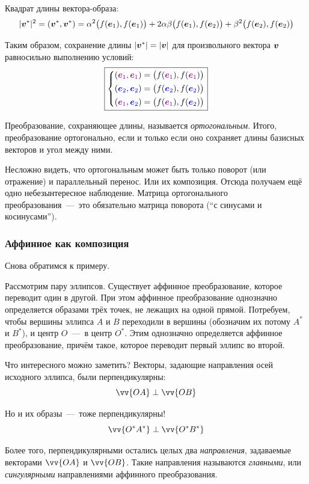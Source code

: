 \documentclass[a4paper,12pt]{article}
\begin{document}
  Квадрат длины вектора-образа:
  \[
    |\boldsymbol v^*|^2 = (\boldsymbol v^*, \boldsymbol v^*) = \alpha^2 \bigl(f(\boldsymbol e_1), f(\boldsymbol e_1)\bigr) + 2 \alpha \beta \bigl(f(\boldsymbol e_1), f(\boldsymbol e_2)\bigr) + \beta^2 \bigl(f(\boldsymbol e_2), f(\boldsymbol e_2)\bigr)
  \]
  
  Таким образом, сохранение длины $|\bds v^*| \hm= |\bds v|$ для произвольного вектора $\boldsymbol v$ равносильно выполнению условий:
  \[
    \boxed{
      \left\{
        \begin{aligned}
          &(\textcolor{my-red}{\bds e_1}, \textcolor{my-red}{\bds e_1}) = \bigl(f(\textcolor{my-red}{\bds e_1}), f(\textcolor{my-red}{\bds e_1})\bigr)\\
          &(\textcolor{my-blue}{\bds e_2}, \textcolor{my-blue}{\bds e_2}) = \bigl(f(\textcolor{my-blue}{\bds e_2}), f(\textcolor{my-blue}{\bds e_2})\bigr)\\
          &(\textcolor{my-red}{\bds e_1}, \textcolor{my-blue}{\bds e_2}) = \bigl(f(\textcolor{my-red}{\bds e_1}), f(\textcolor{my-blue}{\bds e_2})\bigr)
        \end{aligned}
      \right.
    }
  \]
  
  Преобразование, сохраняющее длины, называется \emph{ортогональным}.
  Итого, преобразование ортогонально, если и только если оно сохраняет длины базисных векторов и угол между ними.
  
  Несложно видеть, что ортогональным может быть только поворот (или отражение) и параллельный перенос.
  Или их композиция.
  Отсюда получаем ещё одно небезынтересное наблюдение.
  Матрица ортогонального преобразования~---~это обязательно матрица поворота (``с синусами и косинусами'').
  
  
  \subsubsection{Аффинное как композиция}
  
  Снова обратимся к примеру.
  
  \begin{example}
    Рассмотрим пару эллипсов.
    Существует аффинное преобразование, которое переводит один в другой.
    При этом аффинное преобразование однозначно определяется образами трёх точек, не лежащих на одной прямой.
    Потребуем, чтобы вершины эллипса $A$ и $B$ переходили в вершины (обозначим их потому $A^*$ и $B^*$), и центр $O$~---~в центр $O^*$.
    Этим однозначно определяется аффинное преобразование, причём такое, которое переводит первый эллипс во второй.
    
    Что интересного можно заметить?
    Векторы, задающие направления осей исходного эллипса, были перпендикулярны:
    \[
      \vv{OA} \perp \vv{OB}
    \]
    
    Но и их образы~---~тоже перпендикулярны!
    \[
      \vv{O^*A^*} \perp \vv{O^*B^*}
    \]
    
    Более того, перпендикулярными остались целых два \emph{направления}, задаваемые векторами $\vv{OA}$ и $\vv{OB}$.
    Такие направления называются \emph{главными}, или \emph{сингулярными} направлениями аффинного преобразования.
  \end{example}
  
\end{document}

